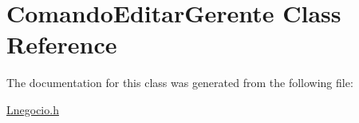 \hypertarget{class_comando_editar_gerente}{}\section{Comando\+Editar\+Gerente Class Reference}
\label{class_comando_editar_gerente}


The documentation for this class was generated from the following file\+:\begin{DoxyCompactItemize}
\item 
\hyperlink{_lnegocio_8h}{Lnegocio.\+h}\end{DoxyCompactItemize}
